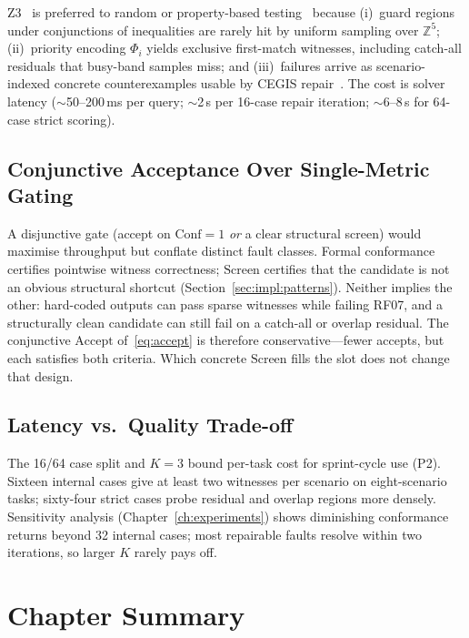 Z3~\citep{demoura2008z3} is preferred to random or property-based
testing~\citep{claessen2000quickcheck,ammann2016testing} because
(i)~guard regions under conjunctions of inequalities are rarely hit by
uniform sampling over $\mathbb{Z}^5$;
(ii)~priority encoding $\Phi_i$ yields exclusive first-match witnesses,
including catch-all residuals that busy-band samples miss; and
(iii)~failures arrive as scenario-indexed concrete counterexamples usable by
CEGIS repair~\citep{sun2024clover}.
The cost is solver latency ($\sim$50--200\,ms per query; $\sim$2\,s per
16-case repair iteration; $\sim$6--8\,s for 64-case strict scoring).

\subsection{Conjunctive Acceptance Over Single-Metric Gating}

A disjunctive gate (accept on $\mathrm{Conf}=1$ \emph{or} a clear structural
screen) would maximise throughput but conflate distinct fault classes.
Formal conformance certifies pointwise witness correctness; $\mathrm{Screen}$
certifies that the candidate is not an obvious structural shortcut
(Section~\ref{sec:impl:patterns}).
Neither implies the other: hard-coded outputs can pass sparse witnesses while
failing RF07, and a structurally clean candidate can still fail on a catch-all
or overlap residual.
The conjunctive $\mathrm{Accept}$ of~\eqref{eq:accept} is therefore
conservative---fewer accepts, but each satisfies both criteria.
Which concrete $\mathrm{Screen}$ fills the slot does not change that design.

\subsection{Latency vs.\ Quality Trade-off}

The 16/64 case split and $K{=}3$ bound per-task cost for sprint-cycle use
(P2).
Sixteen internal cases give at least two witnesses per scenario on
eight-scenario tasks; sixty-four strict cases probe residual and overlap
regions more densely.
Sensitivity analysis (Chapter~\ref{ch:experiments}) shows diminishing
conformance returns beyond 32 internal cases; most repairable faults resolve
within two iterations, so larger $K$ rarely pays off.

\section*{Chapter Summary}

